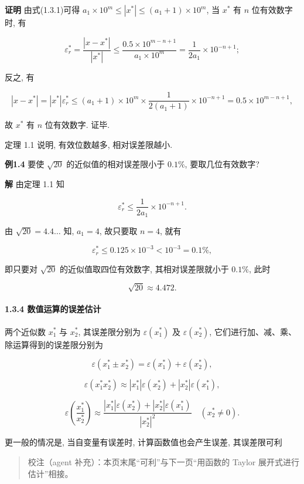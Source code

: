 \documentclass[
  10pt,
  fontset=fandol]{ctexart}
\begin{document}
\textbf{证明} 由式(1.3.1)可得 \(a_1 \times 10^m \leqslant |x^*| \leqslant (a_1+1) \times 10^m\), 当 \(x^*\) 有 \(n\) 位有效数字时, 有

\[
\varepsilon_r^* = \frac{|x-x^*|}{|x^*|} \leqslant \frac{0.5 \times 10^{m-n+1}}{a_1 \times 10^m} = \frac{1}{2a_1} \times 10^{-n+1};
\]

反之, 有

\[
|x-x^*| = |x^*| \varepsilon_r^* \leqslant (a_1+1) \times 10^m \times \frac{1}{2(a_1+1)} \times 10^{-n+1} = 0.5 \times 10^{m-n+1},
\]

故 \(x^*\) 有 \(n\) 位有效数字. 证毕.

定理 1.1 说明, 有效位数越多, 相对误差限越小.

\textbf{例1.4} 要使 \(\sqrt{20}\) 的近似值的相对误差限小于 \(0.1\%\), 要取几位有效数字?

\textbf{解} 由定理 1.1 知

\[
\varepsilon_r^* \leqslant \frac{1}{2a_1} \times 10^{-n+1}.
\]

由 \(\sqrt{20} = 4.4 \dots\) 知, \(a_1 = 4\), 故只要取 \(n=4\), 就有

\[
\varepsilon_r^* \leqslant 0.125 \times 10^{-3} < 10^{-3} = 0.1\%,
\]

即只要对 \(\sqrt{20}\) 的近似值取四位有效数字, 其相对误差限就小于 \(0.1\%\), 此时

\[
\sqrt{20} \approx 4.472.
\]

\paragraph{1.3.4 数值运算的误差估计}\label{ux6570ux503cux8fd0ux7b97ux7684ux8befux5deeux4f30ux8ba1}

两个近似数 \(x_1^*\) 与 \(x_2^*\), 其误差限分别为 \(\varepsilon(x_1^*)\) 及 \(\varepsilon(x_2^*)\), 它们进行加、减、乘、除运算得到的误差限分别为

\[
\varepsilon(x_1^* \pm x_2^*) = \varepsilon(x_1^*) + \varepsilon(x_2^*),
\]

\[
\varepsilon(x_1^* x_2^*) \approx |x_1^*| \varepsilon(x_2^*) + |x_2^*| \varepsilon(x_1^*),
\]

\[
\varepsilon\left(\frac{x_1^*}{x_2^*}\right) \approx \frac{|x_1^*| \varepsilon(x_2^*) + |x_2^*| \varepsilon(x_1^*)}{|x_2^*|^2} \quad (x_2^* \neq 0).
\]

更一般的情况是, 当自变量有误差时, 计算函数值也会产生误差, 其误差限可利

\begin{quote}
校注（agent 补充）：本页末尾``可利''与下一页``用函数的 Taylor 展开式进行估计''相接。
\end{quote}
\end{document}
